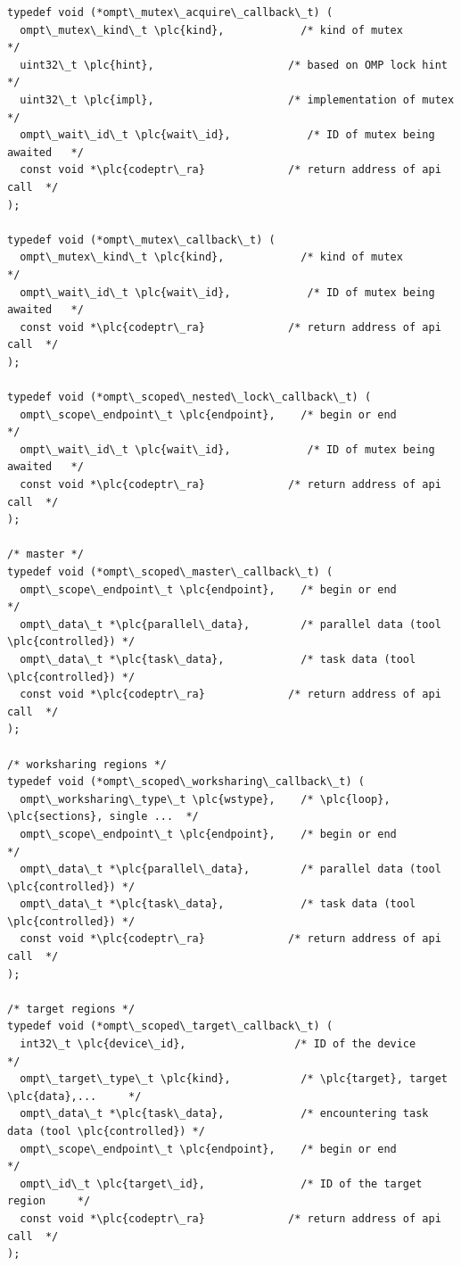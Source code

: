\documentclass{article}
\begin{document}
\begin{boxedcode}
\begin{verbatim}
typedef void (*ompt\_mutex\_acquire\_callback\_t) ( 
  ompt\_mutex\_kind\_t \plc{kind},            /* kind of mutex               */
  uint32\_t \plc{hint},                     /* based on OMP lock hint      */
  uint32\_t \plc{impl},                     /* implementation of mutex     */
  ompt\_wait\_id\_t \plc{wait\_id},            /* ID of mutex being awaited   */
  const void *\plc{codeptr\_ra}             /* return address of api call  */          
);

typedef void (*ompt\_mutex\_callback\_t) ( 
  ompt\_mutex\_kind\_t \plc{kind},            /* kind of mutex               */ 
  ompt\_wait\_id\_t \plc{wait\_id},            /* ID of mutex being awaited   */
  const void *\plc{codeptr\_ra}             /* return address of api call  */          
);

typedef void (*ompt\_scoped\_nested\_lock\_callback\_t) ( 
  ompt\_scope\_endpoint\_t \plc{endpoint},    /* begin or end                */ 
  ompt\_wait\_id\_t \plc{wait\_id},            /* ID of mutex being awaited   */
  const void *\plc{codeptr\_ra}             /* return address of api call  */          
);

/* master */
typedef void (*ompt\_scoped\_master\_callback\_t) ( 
  ompt\_scope\_endpoint\_t \plc{endpoint},    /* begin or end                */
  ompt\_data\_t *\plc{parallel\_data},        /* parallel data (tool \plc{controlled}) */
  ompt\_data\_t *\plc{task\_data},            /* task data (tool \plc{controlled}) */
  const void *\plc{codeptr\_ra}             /* return address of api call  */
);

/* worksharing regions */
typedef void (*ompt\_scoped\_worksharing\_callback\_t) (
  ompt\_worksharing\_type\_t \plc{wstype},    /* \plc{loop}, \plc{sections}, single ...  */
  ompt\_scope\_endpoint\_t \plc{endpoint},    /* begin or end                */
  ompt\_data\_t *\plc{parallel\_data},        /* parallel data (tool \plc{controlled}) */
  ompt\_data\_t *\plc{task\_data},            /* task data (tool \plc{controlled}) */
  const void *\plc{codeptr\_ra}             /* return address of api call  */
);

/* target regions */
typedef void (*ompt\_scoped\_target\_callback\_t) ( 
  int32\_t \plc{device\_id},                 /* ID of the device            */
  ompt\_target\_type\_t \plc{kind},           /* \plc{target}, target \plc{data},...     */
  ompt\_data\_t *\plc{task\_data},            /* encountering task data (tool \plc{controlled}) */
  ompt\_scope\_endpoint\_t \plc{endpoint},    /* begin or end                */ 
  ompt\_id\_t \plc{target\_id},               /* ID of the target region     */
  const void *\plc{codeptr\_ra}             /* return address of api call  */
);


\end{verbatim}
\end{boxedcode}
\end{document}
